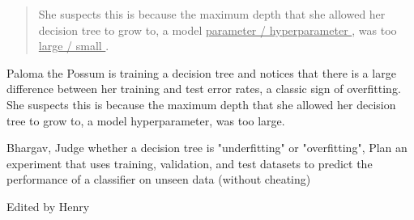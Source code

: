 \begin{parts}
\begin{quote}
            She suspects this is because the maximum depth that she allowed her decision tree to grow to, a model \underline{\quad parameter \quad / \quad hyperparameter \quad}, was too \underline{\quad large \quad / \quad small \quad}.
    \end{quote}
    \singlespacing
    
    \begin{soln}
        Paloma the Possum is training a decision tree and notices that there is a large difference between her training and test error rates, a classic sign of overfitting. She suspects this is because the maximum depth that she allowed her decision tree to grow to, a model hyperparameter, was too large.
    \end{soln}
    \begin{qauthor}
        Bhargav, Judge whether a decision tree is "underfitting" or "overfitting", Plan an experiment that uses training, validation, and test datasets to predict the performance of a classifier on unseen data (without cheating)

        Edited by Henry
    \end{qauthor}
    
\end{parts}
